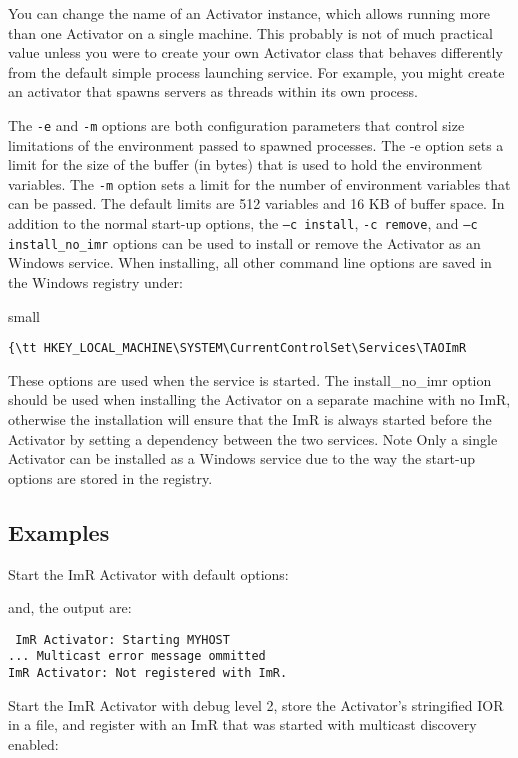 You can change the name of an Activator instance, which allows running more than one Activator on a
single machine. This probably is not of much practical value unless you were to create your own Activator
class that behaves differently from the default simple process launching service. For example, you might
create an activator that spawns servers as threads within its own process.

The {\tt -e} and {\tt -m} options are both configuration parameters that control size limitations of the
environment passed to spawned processes. The -e option sets a limit for the size of the buffer (in bytes)
that is used to hold the environment variables. The {\tt -m} option sets a limit for the number of
environment variables that can be passed. The default limits are 512 variables and 16 KB of buffer space.
In addition to the normal start-up options, the {\tt –c install}, {\tt -c remove}, and {\tt –c install_no_imr}
options can be used to install or remove the Activator as an Windows service. When installing, all other
command line options are saved in the Windows registry under:

small{
\begin{verbatim}
{\tt HKEY_LOCAL_MACHINE\SYSTEM\CurrentControlSet\Services\TAOImR
\end{verbatim}
}

These options are used when the service is started. The install_no_imr option should be used when
installing the Activator on a separate machine with no ImR, otherwise the installation will ensure that
 the ImR is always started before the Activator by setting a dependency between the two services.
Note Only a single Activator can be installed as a Windows service due to the way the start-up options
are stored in the registry.

\subsection{Examples}

Start the ImR Activator with default options:


and, the output are:

\begin{verbatim}
 ImR Activator: Starting MYHOST
... Multicast error message ommitted
ImR Activator: Not registered with ImR.
 \end{verbatim}

Start the ImR Activator with debug level 2, store the Activator’s stringified IOR in a file, and register
with an ImR that was started with multicast discovery enabled:

